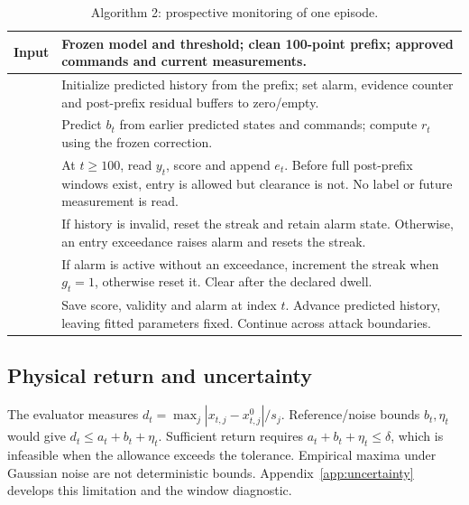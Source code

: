 \begin{table}[t]\centering
\caption{Algorithm 2: prospective monitoring of one episode.}\label{alg:replay}
\begin{tabular}{>{\raggedright\arraybackslash}p{}>{\raggedright\arraybackslash}p{}}\toprule
Input & Frozen model and threshold; clean 100-point prefix; approved commands and current measurements.\\\midrule
1 & Initialize predicted history from the prefix; set alarm, evidence counter and post-prefix residual buffers to zero/empty.\\
2 & Predict $b_t$ from earlier predicted states and commands; compute $r_t$ using the frozen correction.\\
3 & At $t\ge100$, read $y_t$, score and append $e_t$. Before full post-prefix windows exist, entry is allowed but clearance is not. No label or future measurement is read.\\
4 & If history is invalid, reset the streak and retain alarm state. Otherwise, an entry exceedance raises alarm and resets the streak.\\
5 & If alarm is active without an exceedance, increment the streak when $g_t=1$, otherwise reset it. Clear after the declared dwell.\\
6 & Save score, validity and alarm at index $t$. Advance predicted history, leaving fitted parameters fixed. Continue across attack boundaries.\\\bottomrule
\end{tabular}
\end{table}

\subsection{Physical return and uncertainty}
The evaluator measures $d_t=\max_j|x_{t,j}-x_{t,j}^0|/s_j$. Reference/noise bounds $b_t,\eta_t$ would give $d_t\le a_t+b_t+\eta_t$. Sufficient return requires $a_t+b_t+\eta_t\le\delta$, which is infeasible when the allowance exceeds the tolerance. Empirical maxima under Gaussian noise are not deterministic bounds. Appendix~\ref{app:uncertainty} develops this limitation and the window diagnostic.

